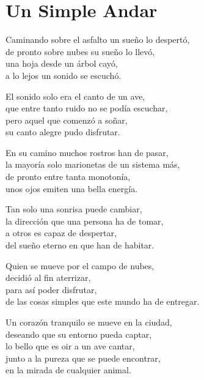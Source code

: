 \section*{Un Simple Andar}
\label{SimpleAndar}

\vspace{1em}
\begin{center}
Caminando sobre el asfalto un sueño lo despertó,\\ 
de pronto sobre nubes su sueño lo llevó,\\ 
una hoja desde un árbol cayó,\\ 
a lo lejos un sonido se escuchó.

\vspace{1em} 
El sonido solo era el canto de un ave,\\ 
que entre tanto ruido no se podía escuchar,\\ 
pero aquel que comenzó a soñar,\\ 
su canto alegre pudo disfrutar.

\vspace{1em} 
En su camino muchos rostros han de pasar,\\ 
la mayoría solo marionetas de un sistema más,\\ 
de pronto entre tanta monotonía,\\ 
unos ojos emiten una bella energía.

\vspace{1em} 
Tan solo una sonrisa puede cambiar,\\ 
la dirección que una persona ha de tomar,\\ 
a otros es capaz de despertar,\\ 
del sueño eterno en que han de habitar.

\vspace{1em} 
Quien se mueve por el campo de nubes,\\ 
decidió al fin aterrizar,\\ 
para así poder disfrutar,\\ 
de las cosas simples que este mundo ha de entregar.

\vspace{1em} 
Un corazón tranquilo se mueve en la ciudad,\\ 
deseando que su entorno pueda captar,\\ 
lo bello que es oir a un ave cantar,\\ 
junto a la pureza que se puede encontrar,\\ 
en la mirada de cualquier animal.


\end{center}
